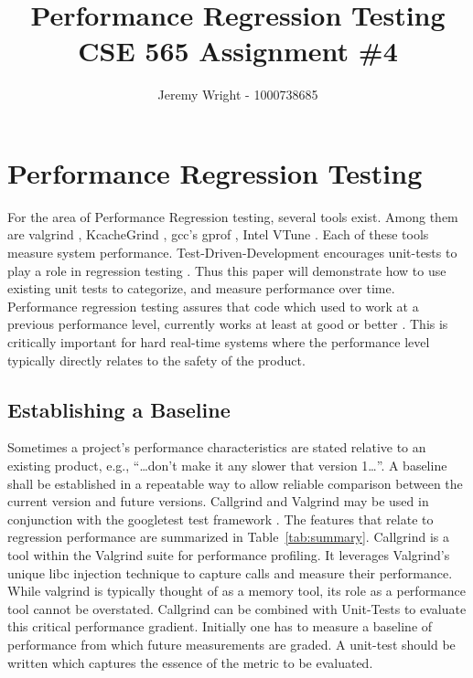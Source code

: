 \documentclass[12pt,journal]{article}
\begin{document}
\doublespace
\title{Performance Regression Testing\\ CSE 565 Assignment \#4}
\author{Jeremy Wright - 1000738685}

\maketitle

\section{Performance Regression Testing}
For the area of Performance Regression testing, several tools exist. Among them
are valgrind \autocite{_valgrind_2014}, KcacheGrind
\autocite{kde_desktop_environment_kcachegrind_2014}, gcc's gprof \autocite{gnu_free_software_foundation_gnu_2014},  Intel VTune
\autocite{_vtune_2014}. Each of these
tools measure system performance. Test-Driven-Development encourages unit-tests
to play a role in regression testing \autocite{_regression_2014}. Thus this
paper will demonstrate how to use existing unit tests to categorize, and
measure performance over time.  Performance regression testing
assures that code which used to work at a previous performance level, currently works at
least at good or better \autocite{_regression_2014}. This is critically
important for hard real-time systems where the performance level typically
directly relates to the safety of the product. 

\subsection{Establishing a Baseline}
Sometimes a project's performance characteristics are stated relative to an
existing product, e.g., ``\ldots don't make it any slower that version
1\ldots''. A baseline shall be established in a repeatable way to allow reliable
comparison between the current version and future versions. Callgrind and
Valgrind may be used in conjunction with the googletest test framework
\autocite{google_googletest_2014}. The features that relate to regression
performance are summarized in Table~\ref{tab:summary}. Callgrind is a tool within the Valgrind suite for performance profiling. It
leverages Valgrind's unique libc injection technique to capture calls and
measure their performance. While valgrind is typically thought of as a memory
tool, its role as a performance tool cannot be overstated.
Callgrind can be combined with Unit-Tests to evaluate this critical performance
gradient. Initially one has to measure a baseline of performance from which
future measurements are graded. A unit-test should be written which captures the
essence of the metric to be evaluated. 
\end{document}
